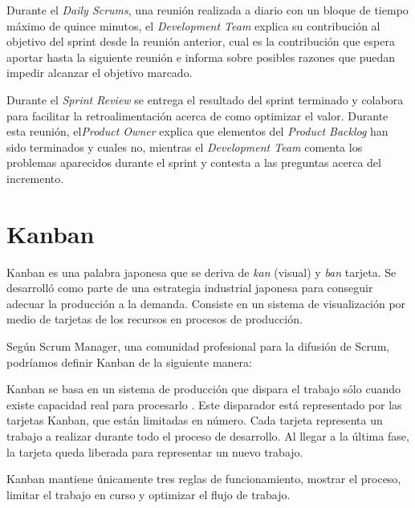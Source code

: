 Durante el \textit{Daily Scrums}, una reunión realizada a diario con un bloque de tiempo máximo de quince minutos, el \textit{Development Team} explica su contribución al objetivo del sprint desde la reunión anterior, cual es la contribución que espera aportar hasta la siguiente reunión e informa sobre posibles razones que puedan impedir alcanzar el objetivo marcado.

Durante el \textit{Sprint Review} se entrega el resultado del sprint terminado y colabora para facilitar la retroalimentación acerca de como optimizar el valor. Durante esta reunión, el\textit{Product Owner} explica que elementos del \textit{Product Backlog} han sido terminados y cuales no, mientras el \textit{Development Team} comenta los problemas aparecidos durante el sprint y contesta a las preguntas acerca del incremento.


\section{Kanban}
Kanban es una palabra japonesa que se deriva de \textit{kan} (visual) y \textit{ban} tarjeta. Se desarrolló como parte de una estrategia industrial japonesa para conseguir adecuar la producción a la demanda. Consiste en un sistema de visualización por medio de tarjetas de los recursos en procesos de producción.

Según Scrum Manager, una comunidad profesional para la difusión de Scrum, podríamos definir Kanban \cite{Pal15} de la siguiente manera:


Kanban se basa en un sistema de producción que dispara el trabajo sólo cuando existe capacidad real para procesarlo \cite{Bahi11}. Este disparador está representado por las tarjetas Kanban, que están limitadas en número. Cada tarjeta representa un trabajo a realizar durante todo el proceso de desarrollo. Al llegar a la última fase, la tarjeta queda liberada para representar un nuevo trabajo.

Kanban mantiene únicamente tres reglas de funcionamiento, mostrar el proceso, limitar el trabajo en curso y optimizar el flujo de trabajo.


